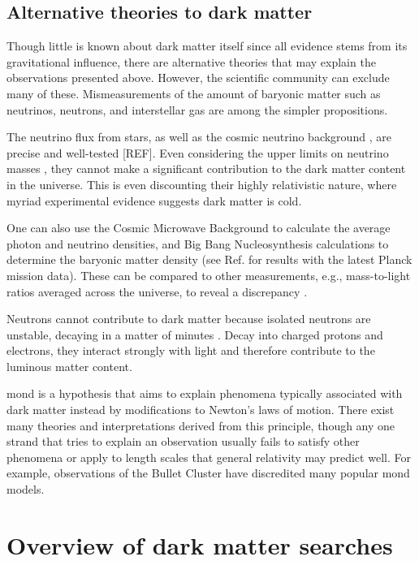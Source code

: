 \subsection{Alternative theories to dark matter}
\label{subsec:intro_alternative_dm_theories}

Though little is known about dark matter itself since all evidence stems from its gravitational influence, there are alternative theories that may explain the observations presented above. However, the scientific community can exclude many of these. Mismeasurements of the amount of baryonic matter such as neutrinos, neutrons, and interstellar gas are among the simpler propositions.

The neutrino flux from stars, as well as the cosmic neutrino background \cite{weinberg2008cosmology}, are precise and well-tested [REF]. Even considering the upper limits on neutrino masses \cite{1742-6596-718-2-022013}, they cannot make a significant contribution to the dark matter content in the universe. This is even discounting their highly relativistic nature, where myriad experimental evidence suggests dark matter is cold.

One can also use the Cosmic Microwave Background to calculate the average photon and neutrino densities, and Big Bang Nucleosynthesis calculations to determine the baryonic matter density (see Ref. \cite{Fields:2019pfx} for results with the latest Planck mission data). These can be compared to other measurements, e.g., mass-to-light ratios averaged across the universe, to reveal a discrepancy \cite{cox2016universal}.

Neutrons cannot contribute to dark matter because isolated neutrons are unstable, decaying in a matter of minutes \cite{PDGbooklet2010}. Decay into charged protons and electrons, they interact strongly with light and therefore contribute to the luminous matter content.

\Gls{mond} is a hypothesis that aims to explain phenomena typically associated with dark matter instead by modifications to Newton's laws of motion. There exist many theories and interpretations derived from this principle, though any one strand that tries to explain an observation usually fails to satisfy other phenomena or apply to length scales that general relativity may predict well. For example, observations of the Bullet Cluster \cite{BulletClusterDMevidence} have discredited many popular \acrshort{mond} models.


\section{Overview of dark matter searches}
\label{sec:intro_dm_searches}

